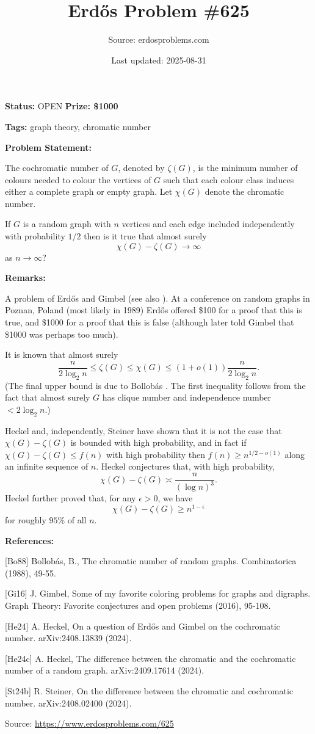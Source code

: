 \documentclass{article}
\title{Erd\H{o}s Problem \#625}
\date{Last updated: 2025-08-31}
\author{Source: erdosproblems.com}
\begin{document}
\maketitle

\noindent\textbf{Status:} OPEN \quad \textbf{Prize: \$1000}

\noindent\textbf{Tags:} graph theory, chromatic number

\medskip
\noindent\textbf{Problem Statement:}

The cochromatic number of $G$, denoted by $\zeta(G)$, is the minimum number of colours needed to colour the vertices of $G$ such that each colour class induces either a complete graph or empty graph. Let $\chi(G)$ denote the chromatic number.

If $G$ is a random graph with $n$ vertices and each edge included independently with probability $1/2$ then is it true that almost surely\[\chi(G) - \zeta(G) \to \infty\]as $n\to \infty$?

\bigskip
\noindent\textbf{Remarks:}

A problem of Erd\H{o}s and Gimbel (see also \cite{Gi16}). At a conference on random graphs in Poznan, Poland (most likely in 1989) Erd\H{o}s offered \$100 for a proof that this is true, and \$1000 for a proof that this is false (although later told Gimbel that \$1000 was perhaps too much).

It is known that almost surely\[\frac{n}{2\log_2n}\leq \zeta(G)\leq \chi(G)\leq (1+o(1))\frac{n}{2\log_2n}.\](The final upper bound is due to Bollob\'{a}s \cite{Bo88}. The first inequality follows from the fact that almost surely $G$ has clique number and independence number $< 2\log_2n$.)

Heckel \cite{He24} and, independently, Steiner \cite{St24b} have shown that it is not the case that $\chi(G)-\zeta(G)$ is bounded with high probability, and in fact if $\chi(G)-\zeta(G) \leq f(n)$ with high probability then $f(n)\geq n^{1/2-o(1)}$ along an infinite sequence of $n$. Heckel conjectures that, with high probability,\[\chi(G)-\zeta(G) \asymp \frac{n}{(\log n)^3}.\]Heckel \cite{He24c} further proved that, for any $\epsilon>0$, we have\[\chi(G) -\zeta(G) \geq n^{1-\epsilon}\]for roughly $95\%$ of all $n$.

\bigskip
\noindent\textbf{References:}

[Bo88] Bollob\'{a}s, B., The chromatic number of random graphs. Combinatorica (1988), 49-55.
 
 [Gi16] J. Gimbel, Some of my favorite coloring problems for graphs and digraphs. Graph Theory: Favorite conjectures and open problems (2016), 95-108.
 
 [He24] A. Heckel, On a question of Erd\H{o}s and Gimbel on the cochromatic number. arXiv:2408.13839 (2024).
 
 [He24c] A. Heckel, The difference between the chromatic and the cochromatic number of a random graph. arXiv:2409.17614 (2024).
 
 [St24b] R. Steiner, On the difference between the chromatic and cochromatic number. arXiv:2408.02400 (2024).

\bigskip
\noindent\small{Source: \url{https://www.erdosproblems.com/625}}
\end{document}
